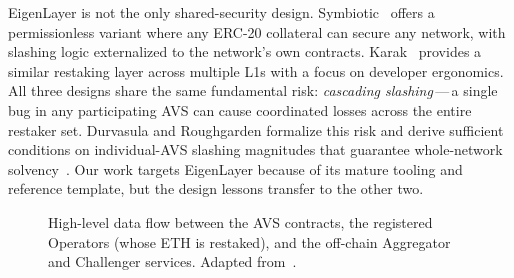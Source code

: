 EigenLayer is not the only shared-security
design.  Symbiotic~\cite{symbiotic2024} offers a
permissionless variant where any ERC-20 collateral can secure any
network, with slashing logic externalized to the network's own
contracts.  Karak~\cite{karak2024} provides a similar restaking layer
across multiple L1s with a focus on developer ergonomics.  All three
designs share the same fundamental risk:
\emph{cascading slashing}\,---\,a single bug in any participating
AVS can cause coordinated losses across the entire restaker
set.  Durvasula and Roughgarden formalize this risk and derive
sufficient conditions on individual-AVS slashing magnitudes that
guarantee whole-network solvency~\cite{durvasula2024robust}.  Our
work targets EigenLayer because of its mature tooling and reference
template, but the design lessons transfer to the other two.

\begin{figure}[t]
  \centering
  \caption{High-level data flow between the AVS contracts, the
           registered Operators (whose ETH is restaked), and the
           off-chain Aggregator and Challenger services.  Adapted
           from~\cite{eigenlabs_avsbook}.}
  \label{fig:eigenlayer-overview}
\end{figure}
